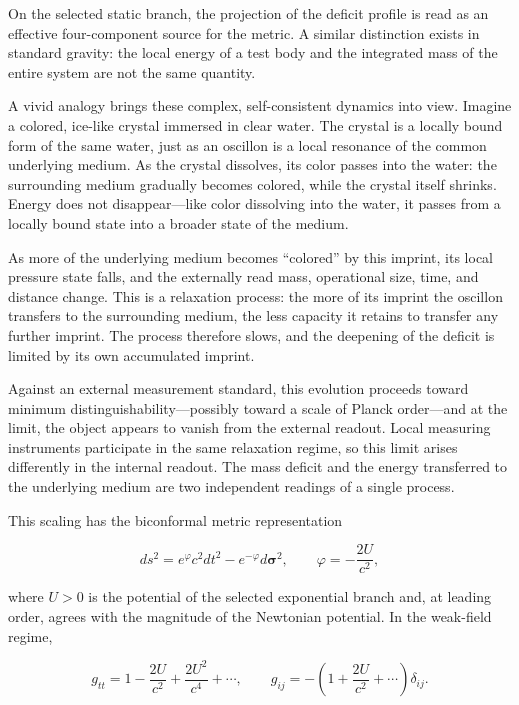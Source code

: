 \documentclass[11pt,a4paper]{article}
\begin{document}
On the selected static branch, the projection of the deficit profile is read as an effective four-component source for the metric. A similar distinction exists in standard gravity: the local energy of a test body and the integrated mass of the entire system are not the same quantity.

A vivid analogy brings these complex, self-consistent dynamics into view. Imagine a colored, ice-like crystal immersed in clear water. The crystal is a locally bound form of the same water, just as an oscillon is a local resonance of the common underlying medium. As the crystal dissolves, its color passes into the water: the surrounding medium gradually becomes colored, while the crystal itself shrinks. Energy does not disappear---like color dissolving into the water, it passes from a locally bound state into a broader state of the medium.

As more of the underlying medium becomes ``colored'' by this imprint, its local pressure state falls, and the externally read mass, operational size, time, and distance change. This is a relaxation process: the more of its imprint the oscillon transfers to the surrounding medium, the less capacity it retains to transfer any further imprint. The process therefore slows, and the deepening of the deficit is limited by its own accumulated imprint.

Against an external measurement standard, this evolution proceeds toward minimum distinguishability---possibly toward a scale of Planck order---and at the limit, the object appears to vanish from the external readout. Local measuring instruments participate in the same relaxation regime, so this limit arises differently in the internal readout. The mass deficit and the energy transferred to the underlying medium are two independent readings of a single process.

This scaling has the biconformal metric representation

\begin{equation}
ds^2=e^\varphi c^2dt^2-e^{-\varphi}d\boldsymbol{\sigma}^2,
\qquad
\varphi=-\frac{2U}{c^2},
\label{eq:bi-conformal-metric}
\end{equation}

where $U>0$ is the potential of the selected exponential branch and, at leading order, agrees with the magnitude of the Newtonian potential. In the weak-field regime,

\begin{equation}
g_{tt}=1-\frac{2U}{c^2}+\frac{2U^2}{c^4}+\cdots,
\qquad
g_{ij}=-\left(1+\frac{2U}{c^2}+\cdots\right)\delta_{ij}.
\label{eq:weak-field-expansion}
\end{equation}
\end{document}
